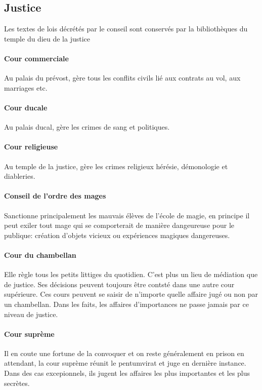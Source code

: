 \subsection{Justice}

Les textes de lois décrétés par le conseil sont conservés par la 
bibliothèques du temple du dieu de la justice \\

  \paragraph{Cour commerciale}
    Au palais du prévost, gère tous les conflits civils lié aux contrats
    au vol, aux marriages etc. \\
  \paragraph{Cour ducale}
    Au palais ducal, gère les crimes de sang et politiques. \\
  \paragraph{Cour religieuse}
    Au temple de la justice, gère les crimes religieux hérésie, démonologie
    et diableries. \\
  \paragraph{Conseil de l'ordre des mages}
    Sanctionne principalement les mauvais élèves de l'école de magie, en
    principe il peut exiler tout mage qui se comporterait de manière 
    dangeureuse pour le publique: création d'objets vicieux ou expériences 
    magiques dangereuses. \\
  \paragraph{Cour du chambellan }
    Elle règle tous les petits littiges du quotidien. C'est 
    plus un lieu de médiation que de justice. Ses décisions peuvent
    toujours être contsté dans une autre cour supérieure. Ces cours peuvent
    se saisir de n'importe quelle affaire jugé ou non par un chambellan.
    Dans les faits, les affaires d'importances ne passe jamais par ce 
    niveau de justice. \\
  \paragraph{Cour suprème}
    Il en coute une fortune de la convoquer et on reste généralement en 
    prison en attendant, la cour suprème réunit le pentumvirat et juge
    en dernière instance. Dans des cas excepionnels, ils jugent les 
    affaires les plus importantes et les plus secrètes. \\

